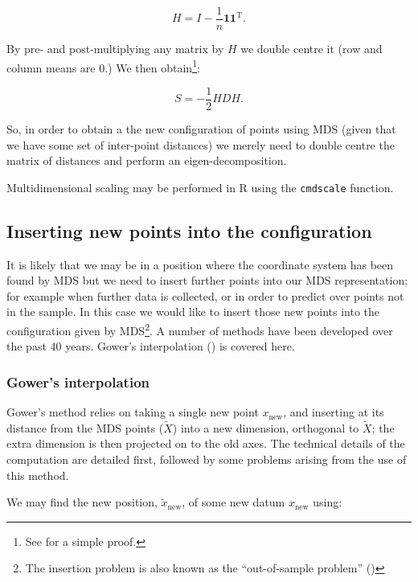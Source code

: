 \documentclass[a4paper,10pt]{amsart}
\newcommand{\tr}[1]{#1^{\text{T}}}
\begin{document}
\begin{equation}
H = I-\frac{1}{n}\mathbf{1}\tr{\mathbf{1}}.
\end{equation}

By pre- and post-multiplying any matrix by $H$ we double centre it (row and column means are 0.) We then obtain\footnote{See \cite{diaconis08} for a simple proof.}:

\begin{equation}
S = -\frac{1}{2}HDH.
\end{equation}

So, in order to obtain a the new configuration of points using MDS (given that we have some set of inter-point distances) we merely need to double centre the matrix of distances and perform an eigen-decomposition.

Multidimensional scaling may be performed in \textsf{R} using the \texttt{cmdscale} function. 

\subsection{Inserting new points into the configuration}

It is likely that we may be in a position where the coordinate system has been found by MDS but we need to insert further points into our MDS representation; for example when further data is collected, or in order to predict over points not in the sample. In this case we would like to insert those new points into the configuration given by MDS\footnote{The insertion problem is also known as the ``out-of-sample problem'' (\cite{Trosset2008})}. A number of methods have been developed over the past 40 years. Gower's interpolation (\cite{gower1968}) is covered here.

\subsubsection{Gower's interpolation} 

Gower's method relies on taking a single new point $x_{\text{new}}$, and inserting at its distance from the MDS points ($\tilde{X}$) into a new dimension, orthogonal to $\tilde{X}$; the extra dimension is then projected on to the old axes. The technical details of the computation are detailed first, followed by some problems arising from the use of this method. 

We may find the new position, $\tilde{x}_{\text{new}}$, of some new datum $x_{\text{new}}$ using:
\end{document}
